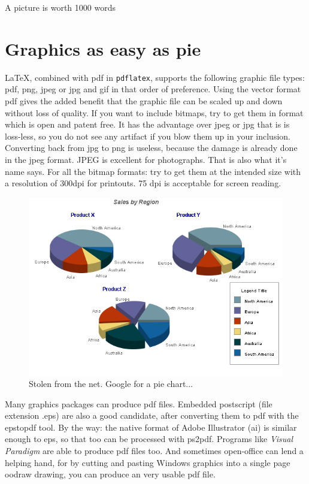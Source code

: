 \renewcommand\TheFile{ch04_graphics.tex}

\begin{savequote}[15cm]
  \vspace{-30mm}
  \raggedleft
  \sffamily
A picture is worth 1000 words
\end{savequote}
\chapter{Graphics as easy as pie}
\LaTeX, combined with pdf in \texttt{pdflatex}, supports the following
graphic file types: pdf, png, jpeg or jpg and gif in that order of
preference. Using the vector format pdf gives the added benefit that
the graphic file can be scaled up and down without loss of quality.
If you want to include bitmaps, try to get them in  format which
is open and patent free. It has the advantage over \gls{jpeg} or jpg that is is
loss-less, so you do not see any artifact if you blow them up in your
inclusion. Converting back from jpg to png is useless, because the
damage is already done in the jpeg format. JPEG is excellent for
photographs. That is also what it's name says. For all the bitmap formats: try to get them at the
intended size with a resolution of 300dpi for printouts. 75 dpi is
acceptable for screen reading.
  
\begin{figure}[thbp]
  \centering
  \includegraphics[width=.8\textwidth]{images/servlet3.png}
  \caption[A Pie chart]{Stolen from the net. Google for a pie chart...}
  \label{fig:pie}
\end{figure}

Many graphics packages can produce pdf files.
Embedded postscript (file extension .eps) are also a good candidate,
after converting them to pdf with the epstopdf tool. By the way: the
native format of Adobe Illustrator (ai) is similar enough to eps, so
that too can be processed with ps2pdf. Programs like {\em Visual
  Paradigm} are able to produce pdf files too. And sometimes open-office can
lend a helping hand, for by cutting and pasting Windows graphics into
a single page oodraw drawing, you can produce an very usable pdf file. 

